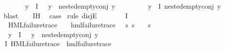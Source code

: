 \begin{isabellebody}
\ \ \ \ \ \ \ \ \ \ \ \ {\isacharparenleft}{\kern0pt}{\isasymforall}y{\isasymin}{\isasymPhi}\ {\isacharbackquote}{\kern0pt}\ I{\isachardot}{\kern0pt}\ {\isasympsi}\ {\isasymnoteq}\ y\ {\isasymlongrightarrow}\ nested{\isacharunderscore}{\kern0pt}empty{\isacharunderscore}{\kern0pt}conj\ y{\isacharparenright}{\kern0pt}{\isacharparenright}{\kern0pt}\ {\isasymor}\isanewline
\ \ \ \ \ \ \ \ {\isacharparenleft}{\kern0pt}{\isasymforall}y{\isasymin}{\isasymPhi}\ {\isacharbackquote}{\kern0pt}\ I{\isachardot}{\kern0pt}\ nested{\isacharunderscore}{\kern0pt}empty{\isacharunderscore}{\kern0pt}conj\ y{\isacharparenright}{\kern0pt}{\isacharparenright}{\kern0pt}{\isachardoublequoteclose}\ \isanewline
\ \ \ \ \isamarkupfalse%
\ blast\isanewline
\ \ \isamarkupfalse%
\ IH\ \isamarkupfalse%
\ {\isacharquery}{\kern0pt}case\ \isamarkupfalse%
{\isacharparenleft}{\kern0pt}rule\ disjE{\isacharparenright}{\kern0pt}\isanewline
\ \ \ \ \isamarkupfalse%
\ {\isachardoublequoteopen}{\isasymexists}{\isasympsi}{\isasymin}{\isasymPhi}\ {\isacharbackquote}{\kern0pt}\ I{\isachardot}{\kern0pt}\isanewline
\ \ \ \ \ \ \ {\isacharparenleft}{\kern0pt}HML{\isacharunderscore}{\kern0pt}failure{\isacharunderscore}{\kern0pt}trace\ {\isasympsi}\ {\isasymand}\ {\isacharparenleft}{\kern0pt}{\isasymexists}{\isasympsi}{\isacharprime}{\kern0pt}{\isachardot}{\kern0pt}\ hml{\isacharunderscore}{\kern0pt}failure{\isacharunderscore}{\kern0pt}trace\ {\isasympsi}{\isacharprime}{\kern0pt}\ {\isasymand}\ {\isacharparenleft}{\kern0pt}{\isasymforall}s{\isachardot}{\kern0pt}\ {\isacharparenleft}{\kern0pt}s\ {\isasymTurnstile}\ {\isasympsi}{\isacharparenright}{\kern0pt}\ {\isacharequal}{\kern0pt}\ {\isacharparenleft}{\kern0pt}s\ {\isasymTurnstile}\ {\isasympsi}{\isacharprime}{\kern0pt}{\isacharparenright}{\kern0pt}{\isacharparenright}{\kern0pt}{\isacharparenright}{\kern0pt}{\isacharparenright}{\kern0pt}\ {\isasymand}\isanewline
\ \ \ \ \ \ \ {\isacharparenleft}{\kern0pt}{\isasymforall}y{\isasymin}{\isasymPhi}\ {\isacharbackquote}{\kern0pt}\ I{\isachardot}{\kern0pt}\ {\isasympsi}\ {\isasymnoteq}\ y\ {\isasymlongrightarrow}\ nested{\isacharunderscore}{\kern0pt}empty{\isacharunderscore}{\kern0pt}conj\ y{\isacharparenright}{\kern0pt}{\isachardoublequoteclose}\isanewline
\ \ \ \ \isamarkupfalse%
\ \isamarkupfalse%
\ {\isasymphi}\ {\isasympsi}\ \ {\isachardoublequoteopen}{\isasymphi}{\isasymin}{\isasymPhi}\ {\isacharbackquote}{\kern0pt}\ I{\isachardoublequoteclose}\ {\isachardoublequoteopen}HML{\isacharunderscore}{\kern0pt}failure{\isacharunderscore}{\kern0pt}trace\ {\isasymphi}{\isachardoublequoteclose}\ {\isachardoublequoteopen}hml{\isacharunderscore}{\kern0pt}failure{\isacharunderscore}{\kern0pt}trace\ {\isasympsi}{\isachardoublequoteclose}\ \isanewline

\end{isabellebody}

